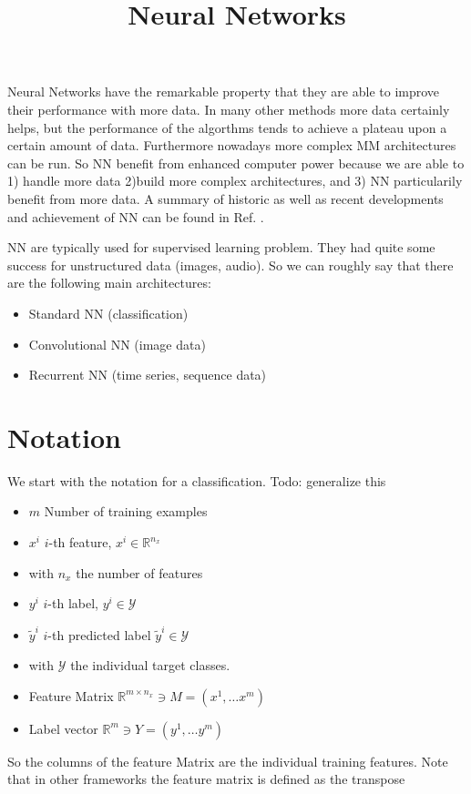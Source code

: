 \documentclass[12pt,a4paper]{article}
\begin{document}

\title{Neural Networks}
\maketitle
\tableofcontents
\newpage

Neural Networks have the remarkable property that they are able to improve their performance with more data. In many other methods more data certainly helps, but the performance of the algorthms tends to achieve a plateau upon a certain amount of data. Furthermore nowadays more complex MM architectures can be run. So NN benefit from enhanced computer power because we are able to 1) handle more data 2)build more complex architectures, and 3) NN particularily benefit from more data. A summary of historic as well as recent developments and achievement of NN can be found in Ref. \cite{DBLP:journals/corr/Schmidhuber14}.

NN are typically used for supervised learning problem. They had quite some success for unstructured data (images, audio). So we can roughly say that there are the following main architectures:
\begin{itemize}	\setlength\itemsep{0em}
\item Standard NN (classification)
\item Convolutional NN (image data)
\item Recurrent NN (time series, sequence data)

\end{itemize}

\section{Notation} 
We start with the notation for a classification. Todo: generalize this
\begin{itemize}	\setlength\itemsep{0em}
\item $m$ Number of training examples
\item $x^i$ $i$-th feature, $x^i \in \mathbb R ^ {n_x}$ 
\item with $n_x$ the number of features
\item $y^i$ $i$-th label, $y^i \in \mathcal Y$
\item $\tilde y^i$ $i$-th predicted label $\tilde y^i \in \mathcal Y$
\item with $\mathcal Y$ the individual target classes.
\item Feature Matrix $\mathbb R^{m \times n_x} \ni M = \left(x^1, \dots x^m\right)  $ 
\item Label vector $\mathbb R ^m \ni Y    = (y^1, \dots y^m)$
\end{itemize}
So the columns of the feature Matrix are the individual training features. Note that in other frameworks the feature matrix is defined as the transpose
\end{document}
